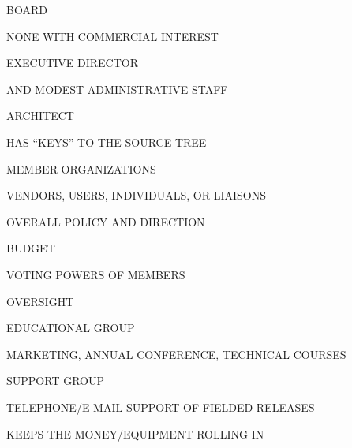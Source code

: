 \begin{bwslide}

\begin{nrtc}
\item	BOARD
    \begin{nrtc}
    \item	NONE WITH COMMERCIAL INTEREST
    \end{nrtc}

\item	EXECUTIVE DIRECTOR
    \begin{nrtc}
    \item	AND MODEST ADMINISTRATIVE STAFF
    \end{nrtc}

\item	ARCHITECT
    \begin{nrtc}
    \item	HAS ``KEYS'' TO THE SOURCE TREE
    \end{nrtc}

\item	MEMBER ORGANIZATIONS
    \begin{nrtc}
    \item	VENDORS, USERS, INDIVIDUALS, OR LIAISONS
    \end{nrtc}
\end{nrtc}
\end{bwslide}


\begin{bwslide}

\begin{nrtc}
\item	OVERALL POLICY AND DIRECTION

\item	BUDGET

\item	VOTING POWERS OF MEMBERS

\item	OVERSIGHT
\end{nrtc}
\end{bwslide}


\begin{bwslide}

\begin{nrtc}
\item	EDUCATIONAL GROUP
    \begin{nrtc}
    \item	MARKETING, ANNUAL CONFERENCE, TECHNICAL COURSES
    \end{nrtc}

\item	SUPPORT GROUP
    \begin{nrtc}
    \item	TELEPHONE/E-MAIL SUPPORT OF FIELDED RELEASES
    \end{nrtc}

\item	KEEPS THE MONEY/EQUIPMENT ROLLING IN
\end{nrtc}
\end{bwslide}


